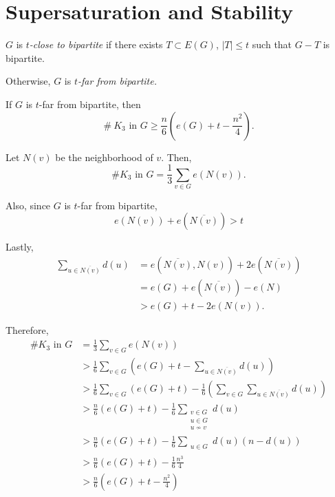 \newpage
\section{Supersaturation and Stability}

\begin{defn}
	$G$ is \emph{$t$-close to bipartite} if there exists $T \subset E(G)$, $|T| \le t$ such that $G - T$ is bipartite.
	
	Otherwise, $G$ is \emph{$t$-far from bipartite.}
\end{defn}

\begin{thm}[F\"{u}redi]\label{thm:furedi}
	If $G$ is $t$-far from bipartite, then \[\#\ K_3 \text{ in } G \ge \frac{n}{6}\left(e(G) + t - \frac{n^2}{4}\right).\]
\end{thm}

\begin{dem}
	Let $N(v)$ be the neighborhood of $v$. Then, \[
		\# K_3 \text{ in } G = \frac{1}{3} \sum_{v \in G}e(N(v)).
	\]

	Also, since $G$ is $t$-far from bipartite,  \[
		e(N(v)) + e(\overline{N(v)}) > t
	\]

	Lastly, \begin{align*}
		\sum_{u \in \overline{N(v)}} d(u) &= e(\overline{N(v)}, N(v)) + 2e(\overline{N(v)})\\
											 &= e(G) + e(\overline{N(v)}) - e(N)\\
											 &> e(G) + t - 2e(N(v)).
	\end{align*}

	Therefore, \begin{align*}	
		\# K_3 \text{ in } G &= \frac{1}{3} \sum_{v \in G}e(N(v))\\
							 &> \frac{1}{6} \sum_{v \in G} \left( e(G) + t - \sum_{u \in \overline{N(v)}} d(u)\right)\\
							 &> \frac{1}{6} \sum_{v \in G} \left( e(G) + t\right)  - \frac{1}{6} \left(\sum_{v\in G}\sum_{u \in \overline{N(v)}} d(u)\right)\\
							 &> \frac{n}{6} \left( e(G) + t\right)  - \frac{1}{6} \sum_{\substack{v\in G\\ u\in G\\ u \not\sim v}} d(u)\\
							 &> \frac{n}{6} \left( e(G) + t\right)  - \frac{1}{6} \sum_{\substack{u \in G}} d(u)(n - d(u))\\
							 &> \frac{n}{6} \left( e(G) + t\right)  - \frac{1}{6} \frac{n^3}{4}\\
							 &> \frac{n}{6} \left( e(G) + t - \frac{n^2}{4}\right)\\
	\end{align*}
\end{dem}


